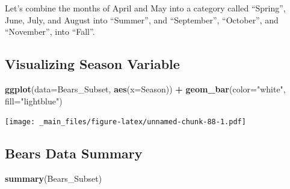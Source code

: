\documentclass[]{book}
\newenvironment{Shaded}{\begin{snugshade}}{\end{snugshade}}
\newcommand{\KeywordTok}[1]{\textcolor[rgb]{0.13,0.29,0.53}{\textbf{#1}}}
\newcommand{\DataTypeTok}[1]{\textcolor[rgb]{0.13,0.29,0.53}{#1}}
\newcommand{\DecValTok}[1]{\textcolor[rgb]{0.00,0.00,0.81}{#1}}
\newcommand{\StringTok}[1]{\textcolor[rgb]{0.31,0.60,0.02}{#1}}
\newcommand{\OperatorTok}[1]{\textcolor[rgb]{0.81,0.36,0.00}{\textbf{#1}}}
\newcommand{\NormalTok}[1]{#1}
\begin{document}
Let's combine the months of April and May into a category called
``Spring'', June, July, and August into ``Summer'', and ``September'',
``October'', and ``November'', into ``Fall''.

\begin{Shaded}
\end{Shaded}

\subsection{Visualizing Season
Variable}\label{visualizing-season-variable}

\begin{Shaded}
\begin{Highlighting}[]
\KeywordTok{ggplot}\NormalTok{(}\DataTypeTok{data=}\NormalTok{Bears_Subset, }\KeywordTok{aes}\NormalTok{(}\DataTypeTok{x=}\NormalTok{Season)) }\OperatorTok{+}\StringTok{ }\KeywordTok{geom_bar}\NormalTok{(}\DataTypeTok{color=}\StringTok{"white"}\NormalTok{, }\DataTypeTok{fill=}\StringTok{"lightblue"}\NormalTok{)}
\end{Highlighting}
\end{Shaded}

\texttt{[image: \_main\_files/figure-latex/unnamed-chunk-88-1.pdf]}

\subsection{Bears Data Summary}\label{bears-data-summary}

\begin{Shaded}
\begin{Highlighting}[]
\KeywordTok{summary}\NormalTok{(Bears_Subset)}
\end{Highlighting}
\end{Shaded}
\end{document}
